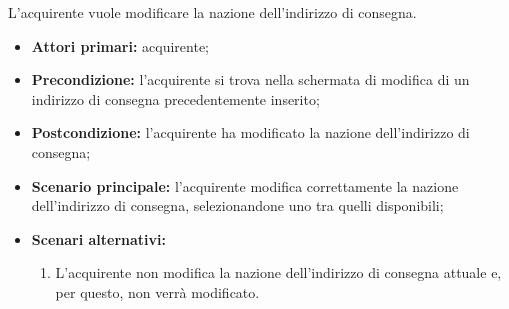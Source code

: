 L'acquirente vuole modificare la nazione dell'indirizzo di consegna.
\begin{itemize}
    \item \textbf{Attori primari:} acquirente;
    \item \textbf{Precondizione:} l'acquirente si trova nella schermata di modifica di un indirizzo di consegna precedentemente inserito;
    \item \textbf{Postcondizione:} l'acquirente ha modificato la nazione dell'indirizzo di consegna;
    \item \textbf{Scenario principale:} l'acquirente modifica correttamente la nazione dell'indirizzo di consegna, selezionandone uno tra quelli disponibili;
    \item \textbf{Scenari alternativi:}
    \begin{enumerate}[label=\lett]
        \item L'acquirente non modifica la nazione dell'indirizzo di consegna attuale e, per questo, non verrà modificato.
    \end{enumerate}
\end{itemize}

\label{modifica-indirizzo-consegna.comune}

